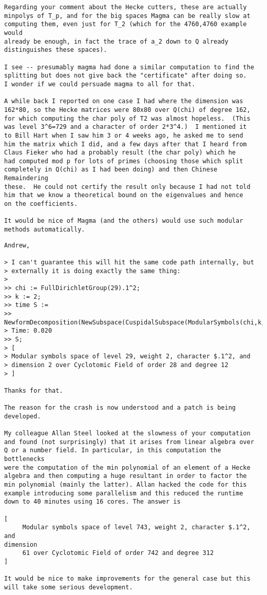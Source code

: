 \documentclass[11pt]{amsart}
\numberwithin{equation}{subsection}
\theoremstyle{plain}
\theoremstyle{definition}
\begin{document}
\begin{verbatim}
Regarding your comment about the Hecke cutters, these are actually 
minpolys of T_p, and for the big spaces Magma can be really slow at 
computing them, even just for T_2 (which for the 4760,4760 example would 
already be enough, in fact the trace of a_2 down to Q already 
distinguishes these spaces).

I see -- presumably magma had done a similar computation to find the 
splitting but does not give back the "certificate" after doing so.  
I wonder if we could persuade magma to all for that.

A while back I reported on one case I had where the dimension was 
162*80, so the Hecke matrices were 80x80 over Q(chi) of degree 162, 
for which computing the char poly of T2 was almost hopeless.  (This 
was level 3^6=729 and a character of order 2*3^4.)  I mentioned it 
to Bill Hart when I saw him 3 or 4 weeks ago, he asked me to send 
him the matrix which I did, and a few days after that I heard from 
Claus Fieker who had a probably result (the char poly) which he 
had computed mod p for lots of primes (choosing those which split 
completely in Q(chi) as I had been doing) and then Chinese Remaindering 
these.  He could not certify the result only because I had not told 
him that we know a theoretical bound on the eigenvalues and hence 
on the coefficients.

It would be nice of Magma (and the others) would use such modular 
methods automatically.
\end{verbatim}

\begin{verbatim}
Andrew,

> I can't guarantee this will hit the same code path internally, but
> externally it is doing exactly the same thing:
> 
>> chi := FullDirichletGroup(29).1^2;
>> k := 2;
>> time S :=
>> NewformDecomposition(NewSubspace(CuspidalSubspace(ModularSymbols(chi,k,-1))));
> Time: 0.020
>> S;
> [
> Modular symbols space of level 29, weight 2, character $.1^2, and
> dimension 2 over Cyclotomic Field of order 28 and degree 12
> ]

Thanks for that.

The reason for the crash is now understood and a patch is being
developed.

My colleague Allan Steel looked at the slowness of your computation
and found (not surprisingly) that it arises from linear algebra over
Q or a number field. In particular, in this computation the bottlenecks
were the computation of the min polynomial of an element of a Hecke
algebra and then computing a huge resultant in order to factor the
min polynomial (mainly the latter). Allan hacked the code for this
example introducing some parallelism and this reduced the runtime
down to 40 minutes using 16 cores. The answer is

[
     Modular symbols space of level 743, weight 2, character $.1^2, and 
dimension
     61 over Cyclotomic Field of order 742 and degree 312
]

It would be nice to make improvements for the general case but this
will take some serious development.
\end{verbatim}
\end{document}
